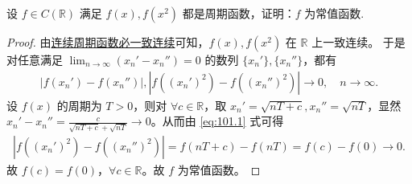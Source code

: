 \documentclass[../../main.tex]{subfiles}
\begin{document}
\begin{example}
设 \(f \in C(\mathbb{R})\) 满足 \(f(x), f(x^2)\) 都是周期函数，证明：\(f\) 为常值函数. 
\end{example}
\begin{proof}
由\hyperref[proposition:连续周期函数必一致连续]{连续周期函数必一致连续}可知，\(f(x),f(x^2)\) 在 \(\mathbb{R}\) 上一致连续。
于是对任意满足 \(\lim_{n \to \infty} (x_n' - x_n'') = 0\) 的数列 \(\{x_n'\}, \{x_n''\}\)，都有
\begin{align}
|f(x_n') - f(x_n'')|, |f((x_n')^2) - f((x_n'')^2)| \to 0, \quad n \to \infty. \label{eq:101.1}
\end{align}
设 \(f(x)\) 的周期为 \(T > 0\)，则对 \(\forall c \in \mathbb{R}\)，取 \(x_n' = \sqrt{nT + c}, x_n'' = \sqrt{nT}\)，显然 \(x_n' - x_n'' = \frac{c}{\sqrt{nT + c} + \sqrt{nT}} \to 0\)。从而由 \eqref{eq:101.1} 式可得
\begin{align*}
|f((x_n')^2) - f((x_n'')^2)| = f(nT + c) - f(nT) = f(c) - f(0) \to 0.
\end{align*}
故 \(f(c) = f(0)\)，\(\forall c \in \mathbb{R}\)。故 \(f\) 为常值函数。

\end{proof}
\end{document}

